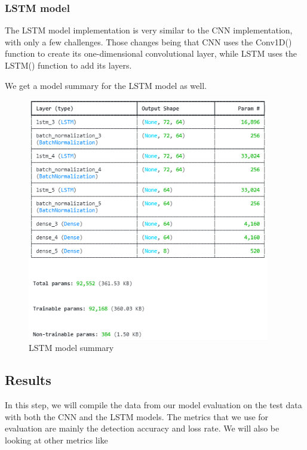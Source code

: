 \subsubsection{LSTM model}
The LSTM model implementation is very similar to the CNN implementation, with only a few challenges. Those changes being that CNN uses the Conv1D() function to create its one-dimensional convolutional layer, while LSTM uses the LSTM() function to add its layers.






We get a model summary for the LSTM model as well.

\begin{figure}[h]
	\centering
	\includegraphics[width=400px]{figures/LSTM_model_summary.png}
	\caption{LSTM model summary}
	\label{fig:test}
\end{figure}













\subsection{Results}
In this step, we will compile the data from our model evaluation on the test data with both the CNN and the LSTM models. The metrics that we use for evaluation are mainly the detection accuracy and loss rate. We will also be looking at other metrics like

